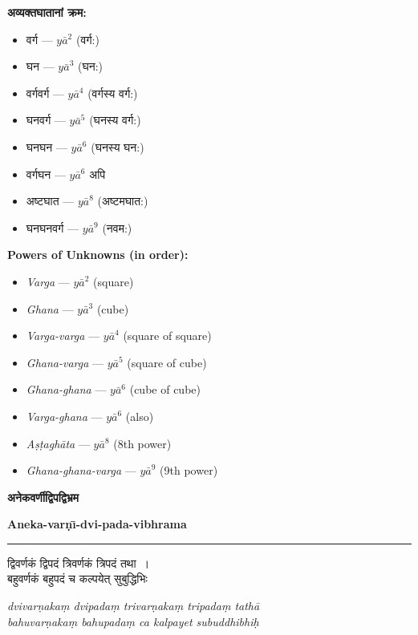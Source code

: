 \documentclass[11pt,a4paper]{article}
\newcommand{\dev}[1]{{\devanagarifont #1}}
\newcommand{\bicol}[2]{%
\noindent%
\begin{minipage}[t]{0.48\textwidth}
\begin{flushleft}
\small
#1
\end{flushleft}
\end{minipage}%
\hfill%
\begin{minipage}[t]{0.48\textwidth}
\begin{flushleft}
\small
#2
\end{flushleft}
\end{minipage}%
\vspace{0.4em}
}
\newcommand{\bicolverse}[2]{%
\par\noindent%
\begin{minipage}[t]{0.48\textwidth}
\centering
\color{versecolor}
\devanagarifont
\small
#1
\end{minipage}%
\hfill%
\begin{minipage}[t]{0.48\textwidth}
\centering
\color{versecolor}
\small
#2
\end{minipage}%
\par\vspace{0.4em}
}
\newcommand{\sectionbicol}[2]{%
\vspace{0.5em}
\noindent%
\begin{minipage}[t]{0.48\textwidth}
\begin{center}
\large\bfseries\color{sectioncolor}
\dev{#1}
\end{center}
\end{minipage}%
\hfill%
\begin{minipage}[t]{0.48\textwidth}
\begin{center}
\large\bfseries\color{sectioncolor}
#2
\end{center}
\end{minipage}%
\vspace{0.3em}
\noindent\rule{\textwidth}{0.4pt}
}
\begin{document}
\bicol{%
\textbf{अव्यक्तघातानां क्रम:}
\begin{itemize}[leftmargin=1.5em,topsep=0pt]
\item \dev{वर्ग} --- $y\bar{a}^2$ (वर्ग:)
\item \dev{घन} --- $y\bar{a}^3$ (घन:)
\item \dev{वर्गवर्ग} --- $y\bar{a}^4$ (वर्गस्य वर्ग:)
\item \dev{घनवर्ग} --- $y\bar{a}^5$ (घनस्य वर्ग:)
\item \dev{घनघन} --- $y\bar{a}^6$ (घनस्य घन:)
\item \dev{वर्गघन} --- $y\bar{a}^6$ अपि
\item \dev{अष्टघात} --- $y\bar{a}^8$ (अष्टमघात:)
\item \dev{घनघनवर्ग} --- $y\bar{a}^9$ (नवम:)
\end{itemize}
}{%
\textbf{Powers of Unknowns (in order):}
\begin{itemize}[leftmargin=1.5em,topsep=0pt]
\item \textit{Varga} --- $y\bar{a}^2$ (square)
\item \textit{Ghana} --- $y\bar{a}^3$ (cube)
\item \textit{Varga-varga} --- $y\bar{a}^4$ (square of square)
\item \textit{Ghana-varga} --- $y\bar{a}^5$ (square of cube)
\item \textit{Ghana-ghana} --- $y\bar{a}^6$ (cube of cube)
\item \textit{Varga-ghana} --- $y\bar{a}^6$ (also)
\item \textit{A\d{s}\d{t}agh\={a}ta} --- $y\bar{a}^8$ (8th power)
\item \textit{Ghana-ghana-varga} --- $y\bar{a}^9$ (9th power)
\end{itemize}
}

\clearpage

\sectionbicol{अनेकवर्णीद्विपद्विभ्रम}{Aneka-var\d{n}\={\i}-dvi-pada-vibhrama}

\vspace{0.3cm}

\bicolverse{%
द्विवर्णकं द्विपदं त्रिवर्णकं त्रिपदं तथा~।\\
बहुवर्णकं बहुपदं च कल्पयेत् सुबुद्धिभिः~
}{%
\textit{dvivar\d{n}aka\d{m} dvipada\d{m} trivar\d{n}aka\d{m} tripada\d{m} tath\={a}}\\
\textit{bahuvar\d{n}aka\d{m} bahupada\d{m} ca kalpayet subuddhibhi\d{h}}
}
\end{document}
